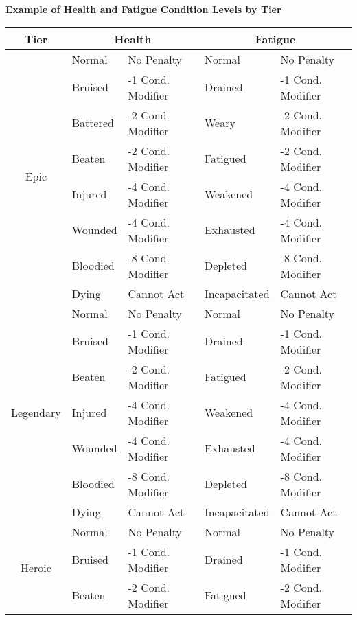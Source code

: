 \documentclass[11pt]{article}
\begin{document}
\newpage
\begin{center}
	\textbf{Example of Health and Fatigue Condition Levels by Tier}
	\begin{tabular}{cllll}                                  \\
		\multicolumn{1}{c}{Tier} & \multicolumn{2}{c}{Health} & \multicolumn{2}{c}{Fatigue} \\
		\hline
		\multirow{8}{*}{Epic}
		 & Normal   & No Penalty              & Normal        & No Penalty              \\
		 & Bruised  & -1  Cond. Modifier & Drained       & -1  Cond. Modifier \\
		 & Battered & -2  Cond. Modifier & Weary         & -2  Cond. Modifier \\
		 & Beaten   & -2  Cond. Modifier & Fatigued      & -2  Cond. Modifier \\
		 & Injured  & -4  Cond. Modifier & Weakened      & -4  Cond. Modifier \\
		 & Wounded  & -4  Cond. Modifier & Exhausted     & -4  Cond. Modifier \\
		 & Bloodied & -8  Cond. Modifier & Depleted      & -8  Cond. Modifier \\
		 & Dying    & Cannot Act              & Incapacitated & Cannot Act              \\
		\hline
		\multirow{7}{*}{Legendary}
		 & Normal   & No Penalty              & Normal        & No Penalty              \\
		 & Bruised  & -1  Cond. Modifier & Drained       & -1  Cond. Modifier \\
		 & Beaten   & -2  Cond. Modifier & Fatigued      & -2  Cond. Modifier \\
		 & Injured  & -4  Cond. Modifier & Weakened      & -4  Cond. Modifier \\
		 & Wounded  & -4  Cond. Modifier & Exhausted     & -4  Cond. Modifier \\
		 & Bloodied & -8  Cond. Modifier & Depleted      & -8  Cond. Modifier \\
		 & Dying    & Cannot Act              & Incapacitated & Cannot Act              \\
		\hline
		\multirow{6}{*}{Heroic}
		 & Normal   & No Penalty              & Normal        & No Penalty              \\
		 & Bruised  & -1  Cond. Modifier & Drained       & -1  Cond. Modifier \\
		 & Beaten   & -2  Cond. Modifier & Fatigued      & -2  Cond. Modifier \\

\end{tabular}
\end{center}
\end{document}

